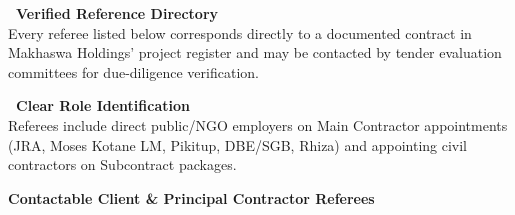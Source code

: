 \documentclass[a4paper,11pt]{article}
\begin{document}
\noindent
\begin{minipage}[t]{0.485\textwidth}
    \begin{tcolorbox}[
        enhanced, colback=white, colframe=mhlightgray, boxrule=0.8pt, arc=4pt,
        left=8pt, right=8pt, top=7pt, bottom=7pt,
        borderline west={3pt}{0pt}{mhnavy}, drop shadow=black!3
    ]
        {\fontsize{9.0pt}{11.0pt}\selectfont\bfseries\color{mhnavy}\faCheckCircle\ Verified Reference Directory}\\[2pt]
        {\fontsize{8.0pt}{10.8pt}\selectfont\color{mhtext}
        Every referee listed below corresponds directly to a documented contract in Makhaswa Holdings' project register and may be contacted by tender evaluation committees for due-diligence verification.
        }
    \end{tcolorbox}
\end{minipage}
\hfill
\begin{minipage}[t]{0.485\textwidth}
    \begin{tcolorbox}[
        enhanced, colback=white, colframe=mhlightgray, boxrule=0.8pt, arc=4pt,
        left=8pt, right=8pt, top=7pt, bottom=7pt,
        borderline west={3pt}{0pt}{mhgold}, drop shadow=black!3
    ]
        {\fontsize{9.0pt}{11.0pt}\selectfont\bfseries\color{mhnavy}\faFileContract\ Clear Role Identification}\\[2pt]
        {\fontsize{8.0pt}{10.8pt}\selectfont\color{mhtext}
        Referees include direct public/NGO employers on Main Contractor appointments (JRA, Moses Kotane LM, Pikitup, DBE/SGB, Rhiza) and appointing civil contractors on Subcontract packages.
        }
    \end{tcolorbox}
\end{minipage}

\vfill

{\large\bfseries\color{mhnavy} Contactable Client \& Principal Contractor Referees}
\vspace{0.10cm}
\end{document}
